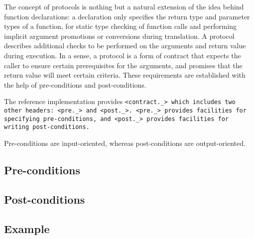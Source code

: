 \def\Subsection#1{\subsection{#1}}

The concept of protocols is nothing but a natural extension of the idea
behind function declarations: a declaration only specifies the return type
and parameter types of a function, for static type checking of function calls
and performing implicit argument promotions or conversions during translation.
A protocol describes additional checks to be performed
on the arguments and return value during execution.
In a sense, a protocol is a form of contract that expects
the caller to ensure certain prerequisites for the arguments,
and promises that the return value will meet certain criteria.
These requirements are established with the
help of pre-conditions and post-conditions.

The reference implementation provides \tt{<contract._>}
which includes two other headers: \tt{<pre._>} and \tt{<post._>}.
\tt{<pre._>} provides facilities for specifying pre-conditions,
and \tt{<post._>} provides facilities for writing post-conditions.

\note Pre-conditions are input-oriented,
whereas post-conditions are output-oriented.

\Subsection{Pre-conditions}

\Subsection{Post-conditions}

\Subsection{Example}
